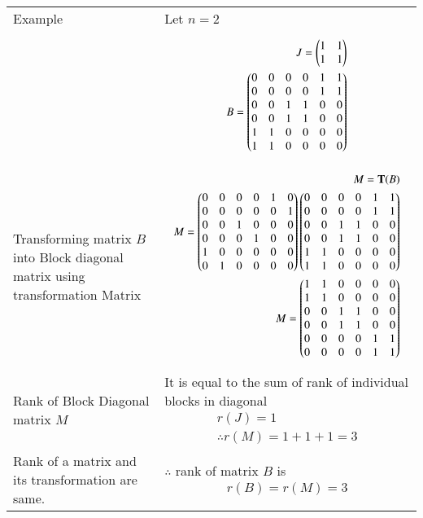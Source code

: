 \begin{table*}[ht!]
\begin{center}
\begin{tabular}{ | m{5cm} | m{10cm}| } \hline 
Example &  Let $n=2$ \\&  
{ \begin{align*}
J = \begin{pmatrix}1&1\\1&1\end{pmatrix}\\
B = \begin{pmatrix}0&0&0&0&1&1\\0&0&0&0&1&1\\0&0&1&1&0&0\\0&0&1&1&0&0\\1&1&0&0&0&0\\1&1&0&0&0&0\end{pmatrix}
\end{align*}}\\  \hline
Transforming matrix $B$ into Block diagonal matrix using transformation Matrix & {\begin{align*}
M = \mathbf{T}(B)\\
M =  \begin{pmatrix}0&0&0&0&1&0\\0&0&0&0&0&1\\0&0&1&0&0&0\\0&0&0&1&0&0\\1&0&0&0&0&0\\0&1&0&0&0&0\end{pmatrix} \begin{pmatrix}0&0&0&0&1&1\\0&0&0&0&1&1\\0&0&1&1&0&0\\0&0&1&1&0&0\\1&1&0&0&0&0\\1&1&0&0&0&0\end{pmatrix}\\
M = \begin{pmatrix}1&1&0&0&0&0\\1&1&0&0&0&0\\0&0&1&1&0&0\\0&0&1&1&0&0\\0&0&0&0&1&1\\0&0&0&0&1&1\end{pmatrix}
\end{align*}}\\  \hline
Rank of Block Diagonal matrix $M$ & It is equal to the sum of rank of individual blocks in diagonal{\begin{align*}
r(J) = 1\\
\therefore r(M) = 1 + 1 + 1 = 3
\end{align*}}\\ \hline
Rank of a matrix and its transformation are same. & $\therefore$ rank of matrix $B$ is {\begin{align*}r(B) = r(M) =3
\end{align*}}\\ \hline 
\end{tabular}
\end{center}
\caption{}
\label{eq:solutions/2016/dec/30/table:2}
\end{table*}
